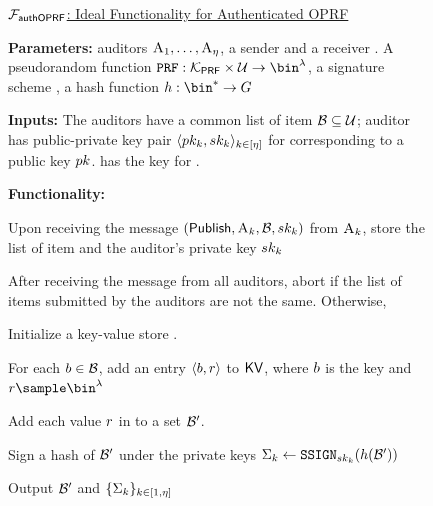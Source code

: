 \begin{figure}
\begin{mdframed}
\footnotesize 

\underline{$\mathcal{F}_{\mathsf{authOPRF}}$: Ideal Functionality for Authenticated OPRF}
		
		
		\smallskip\noindent\textbf{Parameters:} \numAuditors auditors $\auditor[1], \dots, \auditor[\numAuditors]$, a sender \client and a receiver \server. A pseudorandom function $\prf: \prfKeySpace \times \universe   \rightarrow \prfRange$, a signature scheme \sigSchemeDefn, a hash function $\hashFn: \bin^{\ast} \rightarrow \group$   

		\smallskip\noindent\textbf{Inputs:} The auditors have a common list of item $\blocklist \subseteq \universe$;  auditor has public-private key pair $\langle \auditorPubKeyGenericScheme[\auditorIdx], \auditorPrivKeyGenericScheme[\auditorIdx] \rangle_{\auditorIdx \in \nats[\numAuditors]}$ for \sigScheme corresponding to a public key $\pubKey$. \client has the key \prfKey for \prf. 



		\smallskip\noindent\textbf{Functionality:} 
\itemListStart

\item	Upon receiving the message $(\publishList, \auditor[\auditorIdx], \blocklist, \auditorPrivKeyGenericScheme[\auditorIdx])$ from $\auditor[\auditorIdx]$, store the list of item \blocklist and the auditor's private key $\auditorPrivKeyGenericScheme[\auditorIdx]$

\item After receiving the \publishList message from all auditors, abort if the list of items \blocklist submitted by the auditors are not the same. Otherwise, 

\enumListStart
\item Initialize a key-value store \kvs. 
\item For each $\genericBlocklistElmt \in \blocklist$, add an entry $\langle \genericBlocklistElmt, \genericRand \rangle$ to $\mathsf{KV}$, where $\genericBlocklistElmt$ is the key and $\genericRand \getsr \bin^{\secParam}$
\item Add each value $\genericRand$ in \kvs to a set $\blocklist'$.   
\item Sign a hash of $\blocklist'$ under the private keys $\auditorSig{\auditorIdx} \assign \signGenSig[\auditorPrivKeyGenericScheme[\auditorIdx]](\hashFn(\blocklist'))$
\item Output $\blocklist'$ and $\{\Sigma_{k}\}_{k \in [1, \eta]}$


\end{mdframed}
\end{figure}
